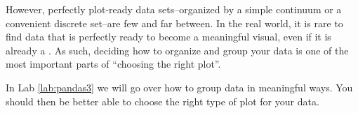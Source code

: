 However, perfectly plot-ready data sets--organized by a simple continuum or a convenient discrete set--are few and far between.
In the real world, it is rare to find data that is perfectly ready to become a meaningful visual, even if it is already a .
As such, deciding how to organize and group your data is one of the most important parts of ``choosing the right plot''.

In Lab \ref{lab:pandas3} we will go over how to group data in meaningful ways.  You should then be better able to choose the right type of plot for your data.
